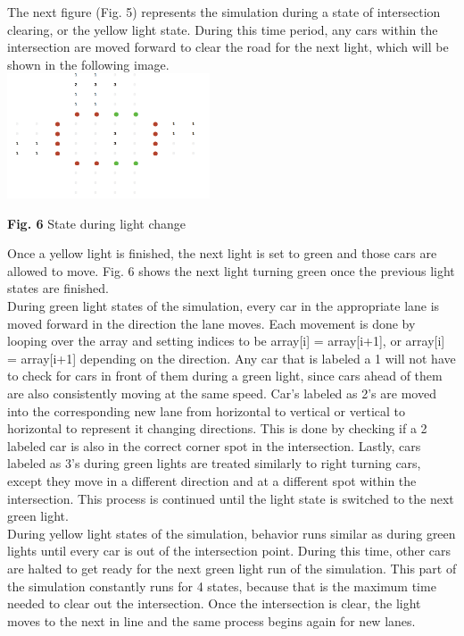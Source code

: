 \documentclass[conference]{IEEEtran}
\begin{document}
The next figure (Fig. 5) represents the simulation during a state of intersection clearing, or the yellow light state. During this time period, any cars within the intersection are moved forward to clear the road for the next light, which will be shown in the following image. \\

\includegraphics[width=0.45\textwidth]{red}
\begin{center}
	\textbf{Fig. 6} State during light change  \\
\end{center}

Once a yellow light is finished, the next light is set to green and those cars are allowed to move. Fig. 6 shows the next light turning green once the previous light states are finished. \\

\hspace*{.2cm} During green light states of the simulation, every car in the appropriate lane is moved forward in the direction the lane moves. Each movement is done by looping over the array and setting indices to be array[i] = array[i+1], or array[i] = array[i+1] depending on the direction. Any car that is labeled a 1 will not have to check for cars in front of them during a green light, since cars ahead of them are also consistently moving at the same speed. Car's labeled as 2's are moved into the corresponding new lane from horizontal to vertical or vertical to horizontal to represent it changing directions. This is done by checking if a 2 labeled car is also in the correct corner spot in the intersection. Lastly, cars labeled as 3's during green lights are treated similarly to right turning cars, except they move in a different direction and at a different spot within the intersection. This process is continued until the light state is switched to the next green light. \\

\hspace*{.2cm} During yellow light states of the simulation, behavior runs similar as during green lights until every car is out of the intersection point. During this time, other cars are halted to get ready for the next green light run of the simulation. This part of the simulation constantly runs for 4 states, because that is the maximum time needed to clear out the intersection. Once the intersection is clear, the light moves to the next in line and the same process begins again for new lanes. \\
\end{document}
